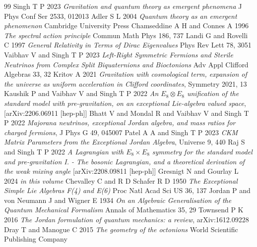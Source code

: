 \documentclass{iopconfser}
\begin{document}
\begin{thebibliography}{99}
\smallskip
{} Singh T P 2023 {\it Gravitation and quantum theory as  emergent phenomena} J Phys Conf Ser 2533, 012013
 Adler S L 2004 {\it Quantum theory as an emergent phenomenon} Cambridge University Press
  Chamseddine A H and Connes A 1996 {\it The spectral action principle} Commun Math Phys 186, 737 
 Landi G and Rovelli C 1997 {\it  General Relativity in Terms of Dirac Eigenvalues} Phys Rev Lett 78, 3051 
 Vaibhav V and Singh T P 2023  {\it Left-Right Symmetric Fermions and Sterile Neutrinos from Complex Split Biquaternions and Bioctonions} Adv Appl Clifford Algebras 33, 32
 Kritov A 2021 {\it Gravitation with cosmological term, expansion of the universe as uniform acceleration in Clifford coordinates}, Symmetry 2021, 13 
 Kaushik P and Vaibhav V  and Singh T P 2022
{\it An $E_8 \otimes E_8$ unification of the standard model with pre-gravitation, on an exceptional Lie-algebra valued space},
[arXiv:2206.06911 [hep-ph]]
 Bhatt V and  Mondal R and Vaibhav V and Singh T P 2022
{\it Majorana neutrinos, exceptional Jordan algebra, and mass ratios for charged fermions},
J Phys G 49, 045007 
 Patel A A and Singh T P 2023
{\it CKM Matrix Parameters from the Exceptional Jordan Algebra},
Universe 9, 440
 Raj S and Singh T P 2022 {\it A Lagrangian with 
$E_8\times E_8$ symmetry for the standard model and pre-gravitation I. - The bosonic Lagrangian, and a theoretical derivation of the weak mixing angle} [arXiv:2208.09811 [hep-ph]]
 Gresnigt N and Gourlay L 2024 {\it in this volume}
 Chevalley C and R D Schafer R D 1950 {\it The Exceptional Simple Lie Algebras F(4) and E(6)} Proc Natl Acad Sci US  36,  137 
  Jordan P and von Neumann J and  Wigner E 1934 {\it On an Algebraic Generalisation of the Quantum Mechanical Formalism} Annals of Mathematics 35, 29 
 Townsend P K  2016 {\it The Jordan formulation of quantum mechanics: a review}, arXiv:1612.09228
 Dray T and Manogue C 2015  {\it The geometry of the octonions} World Scientific Publishing Company 

\end{thebibliography}
\end{document}
